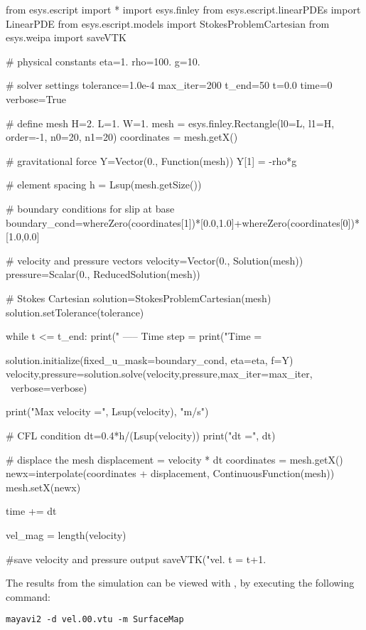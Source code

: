 \begin{python}
  from esys.escript import *
  import esys.finley
  from esys.escript.linearPDEs import LinearPDE
  from esys.escript.models import StokesProblemCartesian
  from esys.weipa import saveVTK

  # physical constants
  eta=1.
  rho=100.
  g=10.

  # solver settings
  tolerance=1.0e-4
  max_iter=200
  t_end=50
  t=0.0
  time=0
  verbose=True

  # define mesh
  H=2.
  L=1.
  W=1.
  mesh = esys.finley.Rectangle(l0=L, l1=H, order=-1, n0=20, n1=20)
  coordinates = mesh.getX()

  # gravitational force
  Y=Vector(0., Function(mesh))
  Y[1] = -rho*g

  # element spacing
  h = Lsup(mesh.getSize())

  # boundary conditions for slip at base
  boundary_cond=whereZero(coordinates[1])*[0.0,1.0]+whereZero(coordinates[0])*[1.0,0.0]

  # velocity and pressure vectors
  velocity=Vector(0., Solution(mesh))
  pressure=Scalar(0., ReducedSolution(mesh))

  # Stokes Cartesian
  solution=StokesProblemCartesian(mesh)
  solution.setTolerance(tolerance)

  while t <= t_end:
    print(" ----- Time step = %
    print("Time = %

    solution.initialize(fixed_u_mask=boundary_cond, eta=eta, f=Y)
    velocity,pressure=solution.solve(velocity,pressure,max_iter=max_iter, \
                                     verbose=verbose)

    print("Max velocity =", Lsup(velocity), "m/s")

    # CFL condition
    dt=0.4*h/(Lsup(velocity))
    print("dt =", dt)

    # displace the mesh
    displacement = velocity * dt
    coordinates = mesh.getX()
    newx=interpolate(coordinates + displacement, ContinuousFunction(mesh))
    mesh.setX(newx)

    time += dt

    vel_mag = length(velocity)

    #save velocity and pressure output
    saveVTK("vel.%
    t = t+1.
\end{python}
%
The results from the simulation can be viewed with \mayavi, by executing the
following command:
%
\begin{verbatim}
mayavi2 -d vel.00.vtu -m SurfaceMap
\end{verbatim}
